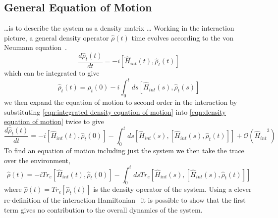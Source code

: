 
\subsection{General Equation of Motion}
\ldots is to describe the system as a density
matrix \ldots
Working in the interaction
picture, a general density operator
\(\hat{\rho}(t)\) time evolves according
to the von Neumann equation~\cite{TP2_Notes}.
\begin{equation}
    \frac{d\hat{\rho}_t(t)}{dt} =
    -i [\hat{H}_{int}(t), \hat{\rho}_t(t)]
    \label{eqn:density equation of motion}
\end{equation}
which can be integrated to give
\begin{equation}
    \hat{\rho}_t(t) =
    \hat{\rho}_t(0)
    - i \int_0^t ds
        [\hat{H}_{int}(s), \hat{\rho}_t(s)]
    \label{eqn:integrated density equation of motion}
\end{equation}
we then expand the equation of motion
to second order in the interaction
by substituting \cref{eqn:integrated density equation of motion}
into \cref{eqn:density equation of motion}
twice to give
\begin{equation}
    \frac{d\hat{\rho}_t(t)}{dt} =
    -i [\hat{H}_{int}(t), \hat{\rho}_t(0)]
    - \int_0^t ds
        [\hat{H}_{int}(s),
            [\hat{H}_{int}(s), \hat{\rho}_t(t)]]
    +\mathcal{O}({\hat{H}_{int}}^3)
\end{equation}
To find an equation of motion
including just the system we then take
the trace over the environment,
\begin{equation}
    \hat{\rho}(t) =
    -i Tr_e[\hat{H}_{int}(t), \hat{\rho}_t(0)]
    - \int_0^t ds
    Tr_e[\hat{H}_{int}(s),
    [\hat{H}_{int}(s), \hat{\rho}_t(t)]]
    \label{eqn:density motion before redfield approximation}
\end{equation}
where \(\hat{\rho}(t) = Tr_e[\hat{\rho}_t(t)]\)
is the density operator of the system.
Using a clever re-definition of the interaction
Hamiltonian~\cite{Manzano_2020} it
is possible to show that the first
term gives no contribution to the
overall dynamics of the system.

